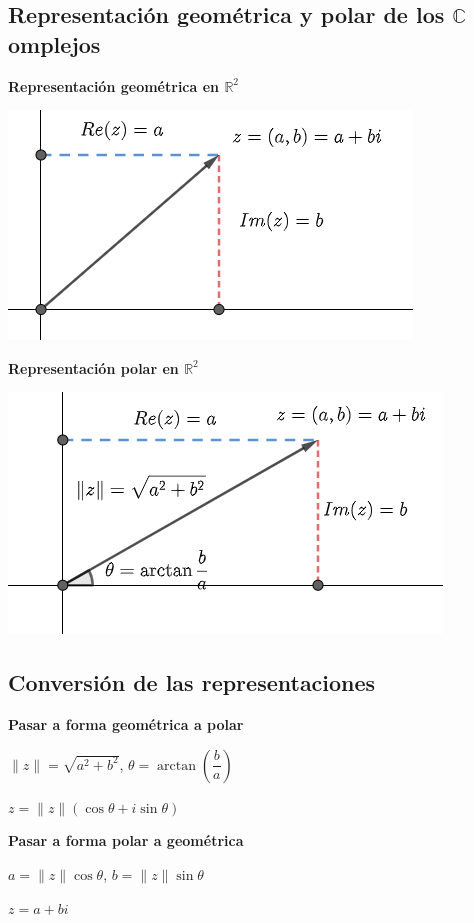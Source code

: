\documentclass[12pt]{article}
\begin{document}
\subsection*{Representación geométrica y polar de los $\mathbb{C}$ omplejos}
\noindent\textbf{Representación geométrica en $\mathbb{R}^2$}
\begin{center}
    \includegraphics{imaginariosGeo.png}
\end{center}
\noindent\textbf{Representación polar en $\mathbb{R}^2$}
\begin{center}
    \includegraphics{imaginariosGeo1.png}
\end{center}
\newpage
\subsection*{Conversión de las representaciones}
\noindent\textbf{Pasar a forma geométrica a polar}
\begin{center}
    $\|z\|=\sqrt{a^2+b^2}$, $\theta=\arctan{\left(\dfrac{b}{a}\right)}$    
\end{center}
\begin{center}
    $z=\|z\|(\cos{\theta}+i\sin{\theta})$
\end{center}
\textbf{Pasar a forma polar a geométrica}
\begin{center}
    $a=\|z\|\cos{\theta}$, $b=\|z\|\sin{\theta}$
\end{center}
\begin{center}
    $z=a+bi$
\end{center}
\end{document}
